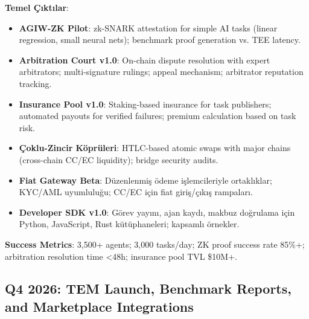 \documentclass[11pt]{article}
\begin{document}
\begin{itemize}[noitemsep]
\begin{itemize}[noitemsep]
\begin{itemize}[noitemsep]
\begin{itemize}[noitemsep]
\begin{itemize}[noitemsep]
\begin{itemize}[noitemsep]
\begin{itemize}[noitemsep]
\begin{enumerate}[noitemsep]
\begin{itemize}[noitemsep]
\textbf{Temel Çıktılar}:
\begin{itemize}[noitemsep]
  \item \textbf{AGIW-ZK Pilot}: zk-SNARK attestation for simple AI tasks (linear regression, small neural nets); benchmark proof generation vs. TEE latency.
  \item \textbf{Arbitration Court v1.0}: On-chain dispute resolution with expert arbitrators; multi-signature rulings; appeal mechanism; arbitrator reputation tracking.
  \item \textbf{Insurance Pool v1.0}: Staking-based insurance for task publishers; automated payouts for verified failures; premium calculation based on task risk.
  \item \textbf{Çoklu-Zincir Köprüleri}: HTLC-based atomic swaps with major chains (cross-chain CC/EC liquidity); bridge security audits.
  \item \textbf{Fiat Gateway Beta}: Düzenlenmiş ödeme işlemcileriyle ortaklıklar; KYC/AML uyumluluğu; CC/EC için fiat giriş/çıkış rampaları.
  \item \textbf{Developer SDK v1.0}: Görev yayını, ajan kaydı, makbuz doğrulama için Python, JavaScript, Rust kütüphaneleri; kapsamlı örnekler.
\end{itemize}

\textbf{Success Metrics}: 3,500+ agents; 3,000 tasks/day; ZK proof success rate 85\%+; arbitration resolution time <48h; insurance pool TVL \$10M+.

\subsection{Q4 2026: TEM Launch, Benchmark Reports, and Marketplace Integrations}


\end{itemize}
\end{enumerate}
\end{itemize}
\end{itemize}
\end{itemize}
\end{itemize}
\end{itemize}
\end{itemize}
\end{itemize}
\end{document}
